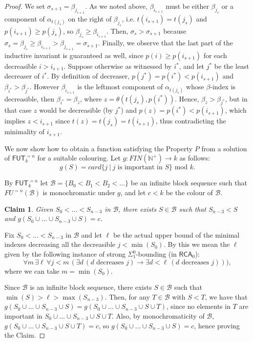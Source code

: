 \documentclass{amsart}
\newcommand\Nat{\mathbb{N}}
\newcommand\RCA{\mathsf{RCA}}
\newcommand\FUT{\mathsf{FUT}}
\newtheorem{claim}{Claim}
\begin{document}
\begin{proof}
We set $\sigma_{s+1} = \beta_{j_{s+1}}$. As we noted above, $\beta_{i_{s+1}}$ must be either $\beta_{j_s}$ or a component of $\alpha_{t(j_s)}$ on the right of $\beta_{j_s}$, i.e. $t(i_{s+1}) = t(j_s)$ and $p(i_{s+1}) \geq p(j_s)$, so $\beta_{j_s} \geq \beta_{i_{s+1}}$. Then, $\sigma_s > \sigma_{s+1}$ because $\sigma_s = \beta_{j_s} \geq \beta_{i_{s+1}} > \beta_{j_{s+1}} = \sigma_{s+1}$. Finally, we observe that the last part of the inductive invariant is guaranteed as well, since $p(i) \geq p(i_{s+1})$ for each decreasible $i>i_{s+1}$. 
Suppose otherwise as witnessed by $i^*$, and let $j^*$ be the least decreaser of $i^*$. By definition of decreaser, $p(j^*) = p(i^*) < p(i_{s+1})$ and $\beta_{i^*} > \beta_{j^*}$. However $\beta_{i_{s+1}}$ is the leftmost component of $\alpha_{t(j_s)}$ whose $\beta$-index is decreasible, then $\beta_{i^*} = \beta_z$, where $z = \theta({t(j_s)},p(i^*))$. Hence, $\beta_z > \beta_{j^*}$, but in that case $z$ would be decreasible (by $j^*$) and $p(z) = p(i^*) < p(i_{s+1})$, which implies $z < i_{s+1}$ since $t(z)=t(j_s)=t(i_{s+1})$, thus contradicting the minimality of $i_{s+1}$.


\bigskip
We now show how to obtain a function satisfying the Property $P$ from a solution of $\FUT^{=n}_k$ for
a suitable colouring. Let $g: FIN(\Nat^+) \rightarrow k$ as follows:
$$
g(S) = card\{j\ |\ j \text{ is important in }  S\} \text{ mod } k.
$$

\medskip

By $\FUT^{=n}_k$ let $\mathcal{B} = \{B_0 < B_1 < B_2 < \ldots\}$ be an infinite block sequence such that $FU^{=n}(\mathcal{B})$ is monochromatic under $g$, and let $c<k$ be the colour of $\mathcal{B}$.

\begin{claim} \label{clm:shorter-union}
Given $S_0\!<\!\ldots\!<\!S_{n-3}$ in $\mathcal{B}$, there exists $S \in \mathcal{B}$ such that $S_{n-3} < S$ and $g(S_0 \cup \ldots \cup S_{n-3} \cup S) = c$.
\end{claim}

Fix $S_0<\ldots<S_{n-3}$ in $\mathcal{B}$ and let $\ell$ be the actual upper bound of the minimal indexes decreasing all the decreasible $j < \min(S_0)$. By this we mean the $\ell$ given by the following instance of strong $\Sigma^0_1$-bounding (in $\RCA_0$): 
$$
\forall m \,\exists \ell \,\forall j < m \,( \exists d \,(d \text{ decreases } j) \to \exists d < \ell \,(d \text{ decreases } j))),
$$
where we can take $m=\min(S_0)$. 

Since $\mathcal{B}$ is an infinite block sequence, there exists $S \in \mathcal{B}$ such that $\min(S) > \ell > \max(S_{n-3})$. Then, for any $T \in \mathcal{B}$ with $S < T$, we have that $g(S_0 \cup \ldots \cup S_{n-3} \cup S) = g(S_0 \cup \ldots \cup S_{n-3} \cup S \cup T)$, since no elements in $T$ are important in $S_0 \cup \ldots \cup S_{n-3} \cup S \cup T$. Also, by monochromaticity of $\mathcal{B}$, $g(S_0 \cup \ldots \cup S_{n-3} \cup S \cup T) = c$, so $g(S_0 \cup \ldots \cup S_{n-3} \cup S) = c$, hence proving the Claim.


\end{proof}
\end{document}

